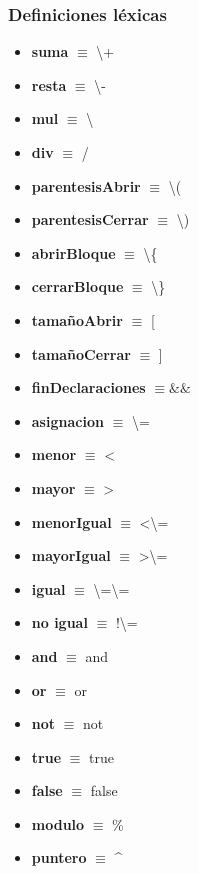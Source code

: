 \documentclass[11pt]{article}
\begin{document}
        \subsubsection*{Definiciones léxicas}
        \begin{itemize}
            \item \textbf{suma }$\equiv$ \textbackslash+
            \item \textbf{resta }$\equiv$ \textbackslash-
            \item \textbf{mul }$\equiv$ \textbackslash*
            \item \textbf{div }$\equiv$ /
            \item \textbf{parentesisAbrir }$\equiv$ \textbackslash(
            \item \textbf{parentesisCerrar }$\equiv$ \textbackslash)
            \item \textbf{abrirBloque }$\equiv$ \textbackslash\{
            \item \textbf{cerrarBloque }$\equiv$ \textbackslash\}
            \item \textbf{tamañoAbrir  }$\equiv$ [
            \item \textbf{tamañoCerrar }$\equiv$ ]
            \item \textbf{finDeclaraciones }$\equiv \&\& $
            \item \textbf{asignacion }$\equiv$ \textbackslash=
            \item \textbf{menor }$\equiv$ \textless
            \item \textbf{mayor }$\equiv$ \textgreater
            \item \textbf{menorIgual }$\equiv$ \textless\textbackslash=
            \item \textbf{mayorIgual }$\equiv$ \textgreater\textbackslash=
            \item \textbf{igual }$\equiv$ \textbackslash=\textbackslash=
            \item \textbf{no igual }$\equiv$ !\textbackslash=
            \item \textbf{and }$\equiv$ and
            \item \textbf{or }$\equiv$ or
            \item \textbf{not }$\equiv$ not
            \item \textbf{true }$\equiv$ true
            \item \textbf{false }$\equiv$ false
            \item \textbf{modulo }$\equiv$ \%
            \item \textbf{puntero }$\equiv$ \^{}

\end{itemize}
\end{document}

